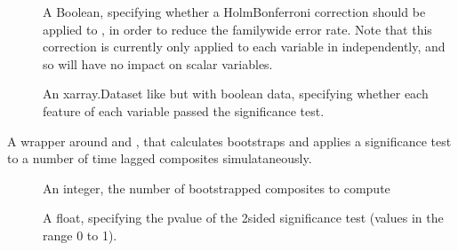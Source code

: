 \documentclass[letterpaper,10pt,english]{sphinxmanual}
\begin{document}
\begin{fulllineitems}
\begin{fulllineitems}
\begin{description}
\item[{}] \leavevmode
\sphinxAtStartPar
A Boolean, specifying whether a Holm\sphinxhyphen{}Bonferroni correction should be applied to , in order to reduce the family\sphinxhyphen{}wide error rate. Note that this correction is currently only applied to each variable in  independently, and so will have no impact on scalar variables.

\item[{}] \leavevmode
\sphinxAtStartPar
An xarray.Dataset like  but with boolean data, specifying whether each feature of each variable passed the significance test.

\end{description}

\end{fulllineitems}


\begin{fulllineitems}
\label{\detokenize{docs/composites:composites.LaggedAnalyser.bootstrap_significance}}
\pysigstartsignatures
{}
\pysigstopsignatures
\sphinxAtStartPar
A wrapper around  and , that calculates bootstraps and applies a significance test to a number of time lagged composites simulataneously.

\sphinxAtStartPar
{}
\begin{description}
\item[{}] \leavevmode
\sphinxAtStartPar
An integer, the number of bootstrapped composites to compute

\item[{}] \leavevmode
\sphinxAtStartPar
A float, specifying the p\sphinxhyphen{}value of the 2\sphinxhyphen{}sided significance test (values in the range 0 to 1).


\end{description}
\end{fulllineitems}
\end{fulllineitems}
\end{document}
